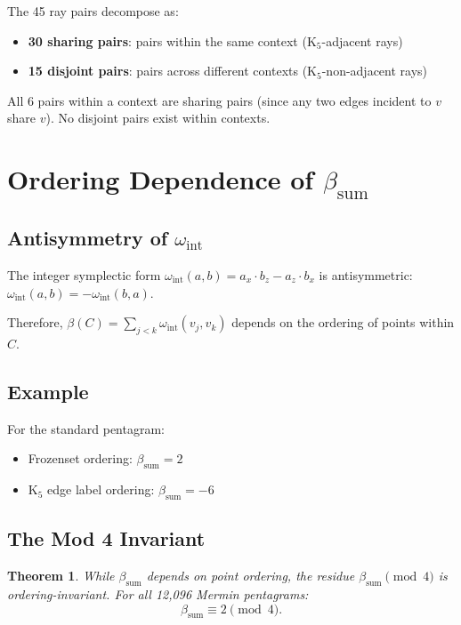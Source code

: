 \documentclass[11pt,a4paper]{article}
\newtheorem{theorem}{Theorem}[section]
\theoremstyle{remark}
\begin{document}
The 45 ray pairs decompose as:
\begin{itemize}
  \item \textbf{30 sharing pairs}: pairs within the same context (K$_5$-adjacent rays)
  \item \textbf{15 disjoint pairs}: pairs across different contexts (K$_5$-non-adjacent rays)
\end{itemize}

All 6 pairs within a context are sharing pairs (since any two edges incident to $v$ share $v$).
No disjoint pairs exist within contexts.


\section{\texorpdfstring{Ordering Dependence of $\beta_{\mathrm{sum}}$}{Ordering Dependence of beta-sum}}\label{sec:ordering}

\subsection{\texorpdfstring{Antisymmetry of $\omega_{\mathrm{int}}$}{Antisymmetry of omega-int}}

The integer symplectic form $\omega_{\mathrm{int}}(a,b) = a_x \cdot b_z - a_z \cdot b_x$ is antisymmetric:
$\omega_{\mathrm{int}}(a,b) = -\omega_{\mathrm{int}}(b,a)$.

Therefore, $\beta(C) = \sum_{j<k} \omega_{\mathrm{int}}(v_j, v_k)$ depends on the ordering of points within $C$.

\subsection{Example}

For the standard pentagram:
\begin{itemize}
  \item Frozenset ordering: $\beta_{\mathrm{sum}} = 2$
  \item K$_5$ edge label ordering: $\beta_{\mathrm{sum}} = -6$
\end{itemize}

\subsection{The Mod 4 Invariant}

\begin{theorem}\label{thm:mod4-invariant}
While $\beta_{\mathrm{sum}}$ depends on point ordering, the residue $\beta_{\mathrm{sum}} \pmod{4}$ is ordering-invariant.
For all 12{,}096 Mermin pentagrams:
\[
  \beta_{\mathrm{sum}} \equiv 2 \pmod{4}.
\]
\end{theorem}
\end{document}
